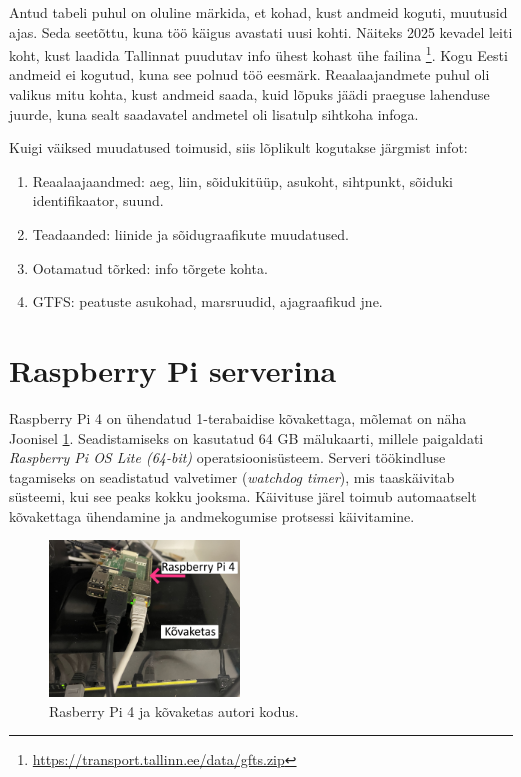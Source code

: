 \newpage
Antud tabeli puhul on oluline märkida, et kohad, kust andmeid koguti, muutusid ajas. Seda seetõttu, kuna töö käigus avastati uusi kohti. Näiteks 2025 kevadel leiti koht, kust laadida Tallinnat puudutav info ühest kohast ühe failina \footnote{\url{https://transport.tallinn.ee/data/gfts.zip}}. Kogu Eesti andmeid ei kogutud, kuna see polnud töö eesmärk. Reaalaajandmete puhul oli valikus mitu kohta, kust andmeid saada, kuid lõpuks jäädi praeguse lahenduse juurde, kuna sealt saadavatel andmetel oli lisatulp sihtkoha infoga.

Kuigi väiksed muudatused toimusid, siis lõplikult kogutakse järgmist infot:
\begin{enumerate}
    \item Reaalaajaandmed: aeg, liin, sõidukitüüp, asukoht, sihtpunkt, sõiduki identifikaator, suund.
    \item Teadaanded: liinide ja sõidugraafikute muudatused.
    \item Ootamatud tõrked: info tõrgete kohta.
    \item GTFS: peatuste asukohad, marsruudid, ajagraafikud jne.
    
\end{enumerate}



\section{Raspberry Pi serverina} %
Raspberry Pi 4 on ühendatud 1-terabaidise kõvakettaga, mõlemat on näha Joonisel \ref{fig:RaspberryPi}. Seadistamiseks on kasutatud 64 GB mälukaarti, millele paigaldati \textit{Raspberry Pi OS Lite (64-bit)} operatsioonisüsteem.
Serveri töökindluse tagamiseks on seadistatud valvetimer (\textit{watchdog timer}), mis taaskäivitab süsteemi, kui see peaks kokku jooksma. Käivituse järel toimub automaatselt kõvakettaga ühendamine ja andmekogumise protsessi käivitamine.

\begin{figure}[h!]
    \centering
    \includegraphics[width=0.45\textwidth]{figures/RaspberryPi.jpg}
    \caption{Rasberry Pi 4 ja kõvaketas autori kodus.}
    \label{fig:RaspberryPi}
\end{figure}

